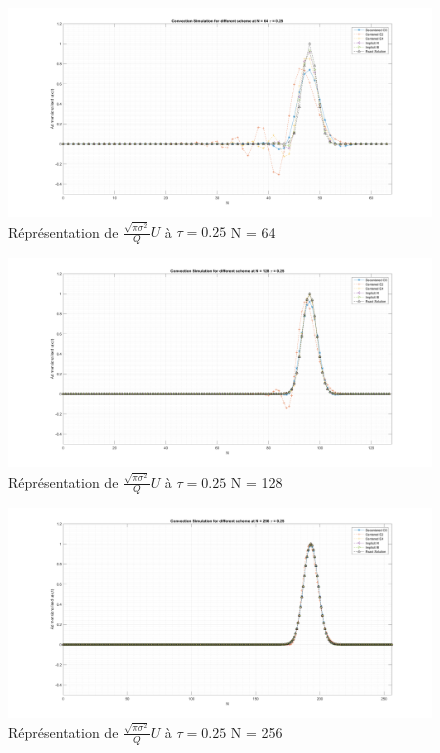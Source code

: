 \documentclass{article}
\begin{document}
\newpage
\begin{figure}[H]
    \centering
    \includegraphics[scale=0.27,angle=90]{img/fig3a.png}
    \caption{Réprésentation de $\frac{\sqrt{\pi \sigma^2}}{Q} U$ à $\tau = 0.25$ N = 64}
    \label{fig3a}
\end{figure}
\begin{figure}[H]
    \centering
    \includegraphics[scale=0.27,angle=90]{img/fig3b.png}
    \caption{Réprésentation de $\frac{\sqrt{\pi \sigma^2}}{Q} U$ à $\tau = 0.25$ N = 128}
    \label{fig3b}
\end{figure}
\begin{figure}[H]
    \centering
    \includegraphics[scale=0.27,angle=90]{img/fig3c.png}
    \caption{Réprésentation de $\frac{\sqrt{\pi \sigma^2}}{Q} U$ à $\tau = 0.25$ N = 256}
    \label{fig3c}
\end{figure}
\end{document}
